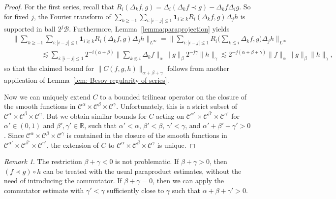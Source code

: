 \documentclass[11pt,a4paper]{article}
\theoremstyle{remark}
\newtheorem{remark}[theorem]{Remark}
\newcommand{\CB}{\ensuremath{\mathscr{B}}}
\newcommand{\CC}{\ensuremath{\mathscr{C}}}
\begin{document}
\begin{proof}
  For the first series, recall that $R_{i} ( \Delta_{k} f,g ) = \Delta_{i} ( \Delta_{k} f \prec g ) - \Delta_{k} f \Delta_{i} g$. So for fixed $j$, the
  Fourier transform of $\sum_{k \geqslant -1} \sum_{i: | i-j | \leqslant 1} \mathbf{1}_{i \gtrsim k} R_{i} ( \Delta_{k} f,g ) \Delta_{j} h$ is
  supported in ball $2^{j} \CB$. Furthermore,
  Lemma~\ref{lemma:paraprojection} yields
  \begin{align*}
     &\Bigg\| \sum_{k \geqslant -1} \sum_{i: | i-j | \leqslant 1} \mathbf{1}_{i \gtrsim k} R_{i} ( \Delta_{k} f,g ) \Delta_{j} h \Bigg\|_{L^{\infty}} = \Bigg\| \sum_{i: | i-j | \leqslant 1} R_{i}  \Bigg( \sum_{k \lesssim i} \Delta_{k} f,g \Bigg) \Delta_{j} h  \Bigg\|_{L^{\infty}} \\
     &\hspace{50pt} \lesssim \sum_{i: | i-j | \leqslant 1} 2^{-i ( \alpha + \beta )} \bigg\| \sum_{k \lesssim i} \Delta_{k} f \bigg\|_{\alpha} \| g \|_{\beta} 2^{-j \gamma} \| h \|_{\gamma} \lesssim 2^{-j ( \alpha + \beta + \gamma )} \| f \|_{\alpha} \| g \|_{\beta} \| h \|_{\gamma},
  \end{align*}
  so that the claimed bound for $\| C ( f,g,h ) \|_{\alpha + \beta + \gamma}$
  follows from another application of Lemma~\ref{lem: Besov regularity of series}.
  
  Now we can uniquely extend $C$ to a bounded trilinear operator on the
  closure of the smooth functions in $\CC^{\alpha} \times \CC^{\beta} \times \CC^{\gamma}$. Unfortunately, this is a strict subset of
  $\CC^{\alpha} \times \CC^{\beta} \times \CC^{\gamma}$. But we obtain similar bounds for $C$ acting on $\CC^{\alpha'} \times \CC^{\beta'} \times \CC^{\gamma'}$ for $\alpha' \in ( 0,1 )$ and
  $\beta' , \gamma' \in \mathbb{R}$, such that $\alpha' < \alpha$, $\beta' < \beta$, $\gamma' < \gamma$, and $\alpha' + \beta'+ \gamma' >0$. Since
  $\CC^{\alpha} \times \CC^{\beta} \times \CC^{\gamma}$ is contained in the
  closure of the smooth functions in $\CC^{\alpha'} \times \CC^{\beta'} \times \CC^{\gamma'}$, the extension of $C$ to $\CC^{\alpha} \times \CC^{\beta} \times \CC^{\gamma}$ is unique.
\end{proof}

\begin{remark}
  The restriction $\beta + \gamma <0$ is not problematic. If $\beta + \gamma >0$, then $( f \prec g ) \circ h$ can be treated with the usual paraproduct estimates, without the need of introducing the commutator. If $\beta + \gamma =0$, then we can apply the commutator estimate with $\gamma' < \gamma$
  sufficiently close to $\gamma$ such that $\alpha + \beta + \gamma' >0$.
\end{remark}
\end{document}
